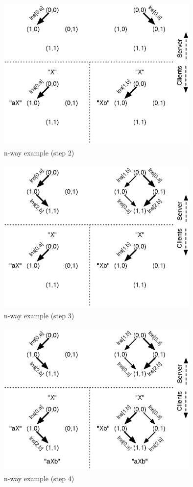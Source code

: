 \begin{figure}[H]
 \centering
 \includegraphics[width=10.0cm,height=7.74cm]{../../images/concepts_nway-example-2.eps}
 \caption{n-way example (step 2)}
 \label{fig:concepts.nway-example-2}
\end{figure}

\begin{figure}[H]
 \centering
 \includegraphics[width=10.0cm,height=7.77cm]{../../images/concepts_nway-example-3.eps}
 \caption{n-way example (step 3)}
 \label{fig:concepts.nway-example-3}
\end{figure}

\begin{figure}[H]
 \centering
 \includegraphics[width=10.0cm,height=7.77cm]{../../images/concepts_nway-example-4.eps}
 \caption{n-way example (step 4)}
 \label{fig:concepts.nway-example-4}
\end{figure}


